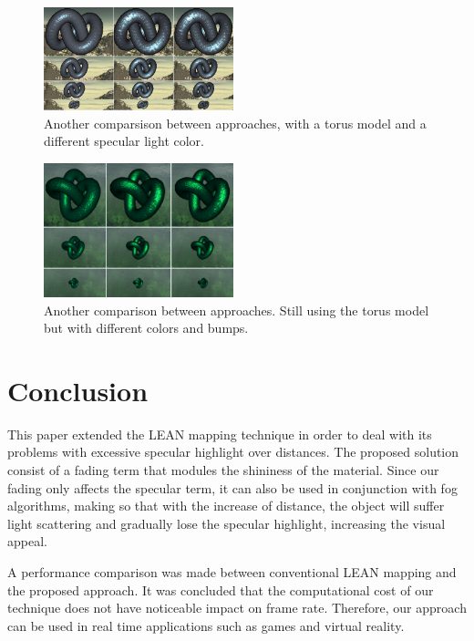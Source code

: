 \documentclass[10pt, conference]{IEEEtran}
\begin{document}
\begin{figure}[h]
	\includegraphics[width=0.49\textwidth]{figs/torus1.png}
	\caption{Another comparsison between approaches, with a torus model and a different specular light color.}
	\label{fig:torus1}
\end{figure}

\begin{figure}[h]
	\includegraphics[width=0.49\textwidth]{figs/torus2.png}
	\caption{Another comparison between approaches. Still using the torus model but with different colors and bumps.}
	\label{fig:torus2}
\end{figure}

\section{Conclusion}
\label{sec:conclusion}
%
This paper extended the LEAN mapping technique in order to deal with its problems with excessive specular highlight over distances. The proposed solution consist of a fading term that modules the shininess of the material. Since our fading only affects the specular term, it can also be used in conjunction with fog algorithms, making so that with the increase of distance, the object will suffer light scattering and gradually lose the specular highlight, increasing the visual appeal.

A performance comparison was made between conventional LEAN mapping and the proposed approach. It was concluded that the computational cost of our technique does not have noticeable impact on frame rate. Therefore, our approach can be used in real time applications such as games and virtual reality.
\end{document}

